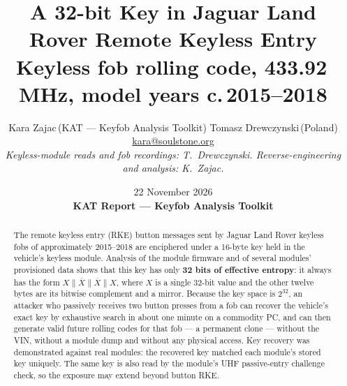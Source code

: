 \documentclass[11pt,a4paper]{article}
\title{A 32-bit Key in Jaguar Land Rover Remote Keyless Entry\\[2pt]
\large Keyless fob rolling code, 433.92\,MHz, model years c.\,2015--2018}
\author{Kara Zajac\,(KAT --- Keyfob Analysis Toolkit) \qquad Tomasz Drewczynski\,(Poland)\\[2pt]
\small \href{mailto:kara@soulstone.org}{kara@soulstone.org}\\[3pt]
\small \textit{Keyless-module reads and fob recordings: T.~Drewczynski. \; Reverse-engineering and analysis: K.~Zajac.}}
\date{22 November 2026 \\[4pt] \small\textbf{KAT Report --- Keyfob Analysis Toolkit}}
\begin{document}
\maketitle

\begin{abstract}
The remote keyless entry (RKE) button messages sent by Jaguar Land Rover keyless fobs of approximately 2015--2018 are enciphered under a 16-byte key held in the vehicle's keyless module. Analysis of the module firmware and of several modules' provisioned data shows that this key has only \textbf{32 bits of effective entropy}: it always has the form $X \parallel \overline{X} \parallel \overline{X} \parallel X$, where $X$ is a single 32-bit value and the other twelve bytes are its bitwise complement and a mirror. Because the key space is $2^{32}$, an attacker who passively receives two button presses from a fob can recover the vehicle's exact key by exhaustive search in about one minute on a commodity PC, and can then generate valid future rolling codes for that fob --- a permanent clone --- without the VIN, without a module dump and without any physical access. Key recovery was demonstrated against real modules: the recovered key matched each module's stored key uniquely. The same key is also read by the module's UHF passive-entry challenge check, so the exposure may extend beyond button RKE.
\end{abstract}
\end{document}
